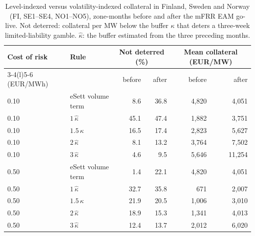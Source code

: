 \begin{table}[!htbp]
\centering
\caption{Level-indexed versus volatility-indexed collateral in Finland, Sweden and Norway (FI, SE1--SE4, NO1--NO5), zone-months before and after the mFRR EAM go-live. Not deterred: collateral per MW below the buffer $\kappa$ that deters a three-week limited-liability gamble. $\hat\kappa$: the buffer estimated from the three preceding months.}
\label{tab:frontier12}
\scriptsize
\begin{tabular}{@{}llrrrr@{}}
\toprule
Cost of risk & Rule & \multicolumn{2}{c}{Not deterred (\%)} & \multicolumn{2}{c}{Mean collateral (EUR/MW)} \\
\cmidrule(lr){3-4}\cmidrule(l){5-6}
(EUR/MWh) & & before & after & before & after \\
\midrule
0.10 & eSett volume term & 8.6 & 36.8 & 4,820 & 4,051 \\
0.10 & $1\,\hat\kappa$ & 45.1 & 47.4 & 1,882 & 3,751 \\
0.10 & $1.5\,\hat\kappa$ & 16.5 & 17.4 & 2,823 & 5,627 \\
0.10 & $2\,\hat\kappa$ & 8.1 & 13.2 & 3,764 & 7,502 \\
0.10 & $3\,\hat\kappa$ & 4.6 & 9.5 & 5,646 & 11,254 \\
0.50 & eSett volume term & 1.4 & 22.1 & 4,820 & 4,051 \\
0.50 & $1\,\hat\kappa$ & 32.7 & 35.8 & 671 & 2,007 \\
0.50 & $1.5\,\hat\kappa$ & 21.9 & 20.5 & 1,006 & 3,010 \\
0.50 & $2\,\hat\kappa$ & 18.9 & 15.3 & 1,341 & 4,013 \\
0.50 & $3\,\hat\kappa$ & 12.4 & 13.7 & 2,012 & 6,020 \\
\bottomrule
\end{tabular}
\end{table}
